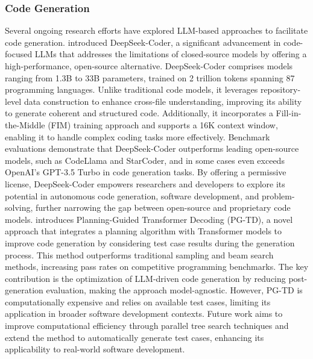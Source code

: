 \subsubsection{Code Generation}
Several ongoing research efforts have explored LLM-based approaches to facilitate code generation. \citet{guo2024deepseek} introduced DeepSeek-Coder, a significant advancement in code-focused LLMs that addresses the limitations of closed-source models by offering a high-performance, open-source alternative. DeepSeek-Coder comprises models ranging from 1.3B to 33B parameters, trained on 2 trillion tokens spanning 87 programming languages. Unlike traditional code models, it leverages repository-level data construction to enhance cross-file understanding, improving its ability to generate coherent and structured code. Additionally, it incorporates a Fill-in-the-Middle (FIM) training approach and supports a 16K context window, enabling it to handle complex coding tasks more effectively. Benchmark evaluations demonstrate that DeepSeek-Coder outperforms leading open-source models, such as CodeLlama and StarCoder, and in some cases even exceeds OpenAI’s GPT-3.5 Turbo in code generation tasks. By offering a permissive license, DeepSeek-Coder empowers researchers and developers to explore its potential in autonomous code generation, software development, and problem-solving, further narrowing the gap between open-source and proprietary code models. \citet{zhang2023planning} introduces Planning-Guided Transformer Decoding (PG-TD), a novel approach that integrates a planning algorithm with Transformer models to improve code generation by considering test case results during the generation process. This method outperforms traditional sampling and beam search methods, increasing pass rates on competitive programming benchmarks. The key contribution is the optimization of LLM-driven code generation by reducing post-generation evaluation, making the approach model-agnostic. However, PG-TD is computationally expensive and relies on available test cases, limiting its application in broader software development contexts. Future work aims to improve computational efficiency through parallel tree search techniques and extend the method to automatically generate test cases, enhancing its applicability to real-world software development.


